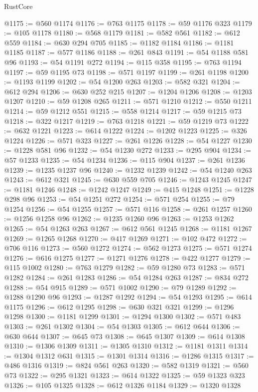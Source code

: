 \begin{lexlean}{RustCore}
\begin{coremodule}
@1175 := @560 @1174
@1176 := @763 @1175
@1178 := @59 @1176 @323
@1179 := @105 @1178
@1180 := @568 @1179
@1181 := @582 @561
@1182 := @612 @559
@1184 := @630 @294 @705
@1185 := @1182 @1184
@1186 := @1181 @1185
@1187 := @577 @1186
@1188 := @261 @843
@1191 := @54 @1188 @581 @96
@1193 := @54 @1191 @272
@1194 := @115 @358
@1195 := @763 @1194
@1197 := @59 @1195 @73
@1198 := @571 @1197
@1199 := @261 @1198
@1200 := @1193 @1199
@1202 := @54 @1200 @263
@1203 := @582 @321
@1204 := @612 @294
@1206 := @630 @252 @215
@1207 := @1204 @1206
@1208 := @1203 @1207
@1210 := @59 @1208 @265
@1211 := @571 @1210
@1212 := @550 @1211
@1214 := @59 @1212 @551
@1215 := @558 @1214
@1217 := @59 @1215 @73
@1218 := @322 @1217
@1219 := @763 @1218
@1221 := @59 @1219 @73
@1222 := @632 @1221
@1223 := @614 @1222
@1224 := @1202 @1223
@1225 := @326 @1224
@1226 := @571 @323
@1227 := @261 @1226
@1228 := @54 @1227
@1230 := @1228 @581 @96
@1232 := @54 @1230 @272
@1233 := @295 @904
@1234 := @57 @1233
@1235 := @54 @1234
@1236 := @115 @904
@1237 := @261 @1236
@1239 := @1235 @1237 @96
@1240 := @1232 @1239
@1242 := @54 @1240 @263
@1243 := @612 @321
@1245 := @630 @559 @705
@1246 := @1243 @1245
@1247 := @1181 @1246
@1248 := @1242 @1247
@1249 := @415 @1248
@1251 := @1228 @298 @96
@1253 := @54 @1251 @272
@1254 := @571 @254
@1255 := @79 @1254
@1256 := @54 @1255
@1257 := @571 @116
@1258 := @261 @1257
@1260 := @1256 @1258 @96
@1262 := @1235 @1260 @96
@1263 := @1253 @1262
@1265 := @54 @1263 @263
@1267 := @612 @561 @1245
@1268 := @1181 @1267
@1269 := @1265 @1268
@1270 := @417 @1269
@1271 := @102 @472
@1272 := @706 @116
@1273 := @560 @1272
@1274 := @562 @1273
@1275 := @571 @1274
@1276 := @616 @1275
@1277 := @1271 @1276
@1278 := @422 @1277
@1279 := @115 @1002
@1280 := @763 @1279
@1282 := @59 @1280 @73
@1283 := @571 @1282
@1284 := @261 @1283
@1286 := @54 @1284 @263
@1287 := @834 @272
@1288 := @54 @915
@1289 := @571 @1002
@1290 := @79 @1289
@1292 := @1288 @1290 @96
@1293 := @1287 @1292
@1294 := @54 @1293
@1295 := @614 @1175
@1296 := @612 @1295
@1298 := @630 @321 @321
@1299 := @1296 @1298
@1300 := @1181 @1299
@1301 := @1294 @1300
@1302 := @571 @483
@1303 := @261 @1302
@1304 := @54 @1303
@1305 := @612 @644
@1306 := @630 @644
@1307 := @645 @73
@1308 := @645 @1307
@1309 := @614 @1308
@1310 := @1306 @1309
@1311 := @1305 @1310
@1312 := @1181 @1311
@1314 := @1304 @1312 @631
@1315 := @1301 @1314
@1316 := @1286 @1315
@1317 := @486 @1316
@1319 := @824 @561 @263
@1320 := @582 @1319
@1321 := @560 @73
@1322 := @295 @1321
@1323 := @614 @1322
@1325 := @59 @1323 @323
@1326 := @105 @1325
@1328 := @612 @1326 @1184
@1329 := @1320 @1328

\end{coremodule}
\end{lexlean}

